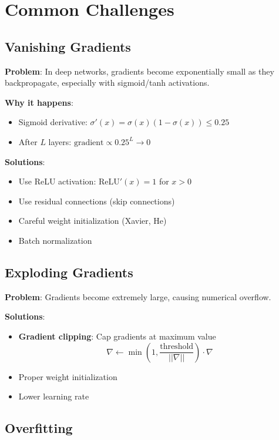 \section{Common Challenges}

\subsection{Vanishing Gradients}

\textbf{Problem}: In deep networks, gradients become exponentially small as they backpropagate, especially with sigmoid/tanh activations.

\textbf{Why it happens}:
\begin{itemize}
    \item Sigmoid derivative: $\sigma'(x) = \sigma(x)(1 - \sigma(x)) \leq 0.25$
    \item After $L$ layers: $\text{gradient} \propto 0.25^L \to 0$
\end{itemize}

\textbf{Solutions}:
\begin{itemize}
    \item Use ReLU activation: $\text{ReLU}'(x) = 1$ for $x > 0$
    \item Use residual connections (skip connections)
    \item Careful weight initialization (Xavier, He)
    \item Batch normalization
\end{itemize}

\subsection{Exploding Gradients}

\textbf{Problem}: Gradients become extremely large, causing numerical overflow.

\textbf{Solutions}:
\begin{itemize}
    \item \textbf{Gradient clipping}: Cap gradients at maximum value
    \[
    \nabla \leftarrow \min\left(1, \frac{\text{threshold}}{||\nabla||}\right) \cdot \nabla
    \]
    \item Proper weight initialization
    \item Lower learning rate
\end{itemize}

\subsection{Overfitting}

